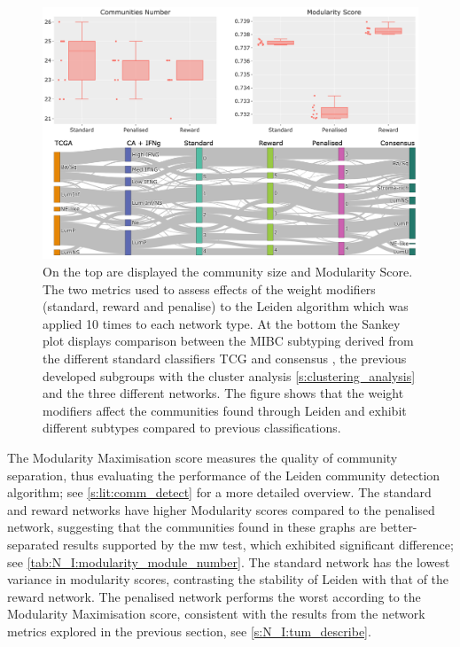 \begin{figure}[!t]    
    \centering
    \includegraphics[width=1.0\textwidth,keepaspectratio]{Sections/Network_I/Resources/Tum_network/LeidenMetrics_Sankey_TF-6.png}
    \caption[Tum: Leiden metrics]{On the top are displayed the community size and Modularity Score. The two metrics used to assess effects of the weight modifiers (standard, reward and penalise) to the Leiden algorithm which was applied 10 times to each network type. At the bottom the Sankey plot displays comparison between the MIBC subtyping derived from the different standard classifiers TCG and consensus \citep{Robertson2017-mg,Kamoun2020-tj}, the previous developed subgroups with the cluster analysis \cref{s:clustering_analysis} and the three different networks. The figure shows that the weight modifiers affect the communities found through Leiden and exhibit different subtypes compared to previous classifications.}
    \label{fig:N_I:tum_leiden_modifiers}
\end{figure}


The Modularity Maximisation score measures the quality of community separation, thus evaluating the performance of the Leiden community detection algorithm; see \cref{s:lit:comm_detect} for a more detailed overview. The standard and reward networks have higher Modularity scores compared to the penalised network, suggesting that the communities found in these graphs are better-separated results supported by the \acrlong{mw} test, which exhibited significant difference; see \cref{tab:N_I:modularity_module_number}. The standard network has the lowest variance in modularity scores, contrasting the stability of Leiden with that of the reward network. The penalised network performs the worst according to the Modularity Maximisation score, consistent with the results from the network metrics explored in the previous section, see \cref{s:N_I:tum_describe}.

